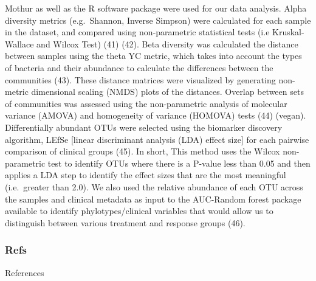 \documentclass[11pt,]{article}
\begin{document}
Mothur as well as the R software package were used for our data
analysis. Alpha diversity metrics (e.g.~Shannon, Inverse Simpson) were
calculated for each sample in the dataset, and compared using
non-parametric statistical tests (i.e Kruskal-Wallace and Wilcox Test)
(41) (42). Beta diversity was calculated the distance between samples
using the theta YC metric, which takes into account the types of
bacteria and their abundance to calculate the differences between the
communities (43). These distance matrices were visualized by generating
non-metric dimensional scaling (NMDS) plots of the distances. Overlap
between sets of communities was assessed using the non-parametric
analysis of molecular variance (AMOVA) and homogeneity of variance
(HOMOVA) tests (44) (vegan). Differentially abundant OTUs were selected
using the biomarker discovery algorithm, LEfSe {[}linear discriminant
analysis (LDA) effect size{]} for each pairwise comparison of clinical
groups (45). In short, This method uses the Wilcox non-parametric test
to identify OTUs where there is a P-value less than 0.05 and then
applies a LDA step to identify the effect sizes that are the most
meaningful (i.e.~greater than 2.0). We also used the relative abundance
of each OTU across the samples and clinical metadata as input to the
AUC-Random forest package available to identify phylotypes/clinical
variables that would allow us to distinguish between various treatment
and response groups (46).

\subsubsection{Refs}\label{refs}

References
\end{document}
